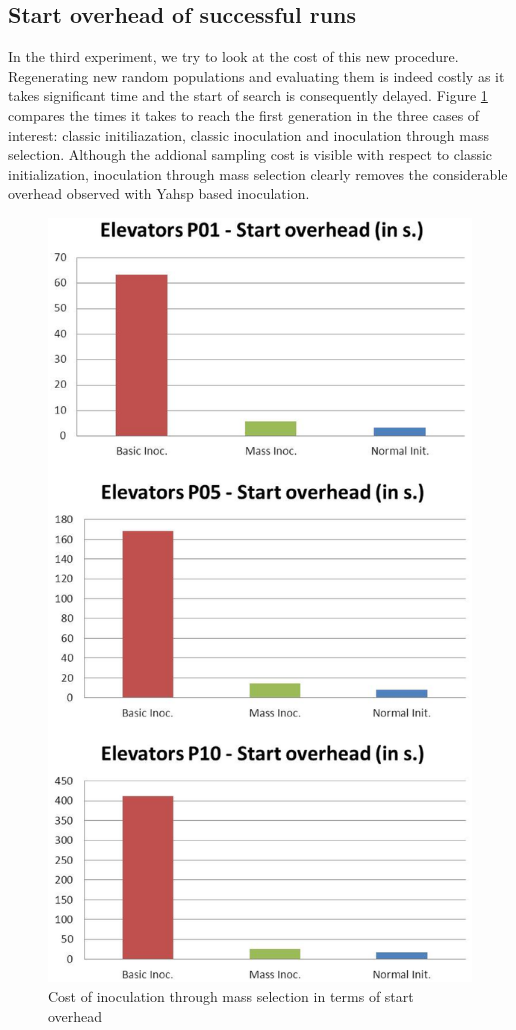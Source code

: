 \documentclass[english]{DESCARWINreport}
\begin{document}
\subsection{Start overhead of successful runs}

In the third experiment, we try to look at the cost of this new procedure. Regenerating new random populations and evaluating them is indeed costly as it takes significant time and the start of search is consequently delayed. Figure \ref{fig:overhead} compares the times it takes to reach the first generation in the three cases of interest: classic initiliazation, classic inoculation and inoculation through mass selection. Although the addional sampling cost is visible with respect to classic initialization, inoculation through mass selection clearly removes the considerable overhead observed with Yahsp based inoculation.

\begin{figure}
	\centering
		\includegraphics[height=0.8\textheight]{pics/overhead_elevators.eps}
	\caption{Cost of inoculation through mass selection in terms of start overhead}
	\label{fig:overhead}
\end{figure}
\end{document}
